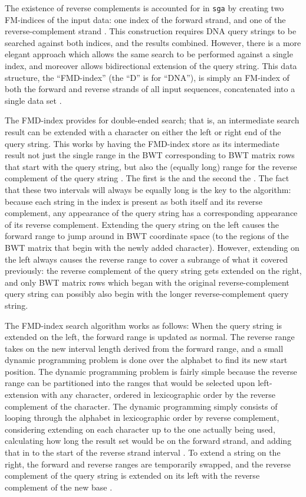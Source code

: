\documentclass[11pt,proposal]{ucthesis}
\begin{document}
The existence of reverse complements is accounted for in \texttt{sga} by creating two FM-indices of the input data: one index of the forward strand, and one of the reverse-complement strand \cite{simpson2012efficient}. This construction requires DNA query strings to be searched against both indices, and the results combined. However, there is a more elegant approach which allows the same search to be performed against a single index, and moreover allows bidirectional extension of the query string. This data structure, the ``FMD-index'' (the ``D'' is for ``DNA''), is simply an FM-index of both the forward and reverse strands of all input sequences, concatenated into a single data set \cite{li2012exploring}.

The FMD-index provides for double-ended search; that is, an intermediate search result can be extended with a character on either the left or right end of the query string. This works by having the FMD-index store as its intermediate result not just the single range in the BWT corresponding to BWT matrix rows that start with the query string, but also the (equally long) range for the reverse complement of the query string \cite{li2012exploring}. The first is the  and the second the . The fact that these two intervals will always be equally long is the key to the algorithm: because each string in the index is present as both itself and its reverse complement, any appearance of the query string has a corresponding appearance of its reverse complement. Extending the query string on the left causes the forward range to jump around in BWT coordinate space (to the regions of the BWT matrix that begin with the newly added character). However, extending on the left always causes the reverse range to cover a subrange of what it covered previously: the reverse complement of the query string gets extended on the right, and only BWT matrix rows which began with the original reverse-complement query string can possibly also begin with the longer reverse-complement query string.

The FMD-index search algorithm works as follows: When the query string is extended on the left, the forward range is updated as normal. The reverse range takes on the new interval length derived from the forward range, and a small dynamic programming problem is done over the alphabet to find its new start position. The dynamic programming problem is fairly simple because the reverse range can be partitioned into the ranges that would be selected upon left-extension with any character, ordered in lexicographic order by the reverse complement of the character. The dynamic programming simply consists of looping through the alphabet in lexicographic order by reverse complement, considering extending on each character up to the one actually being used, calculating how long the result set would be on the forward strand, and adding that in to the start of the reverse strand interval \cite{li2012exploring}. To extend a string on the right, the forward and reverse ranges are temporarily swapped, and the reverse complement of the query string is extended on its left with the reverse complement of the new base \cite{li2012exploring}.
\end{document}
